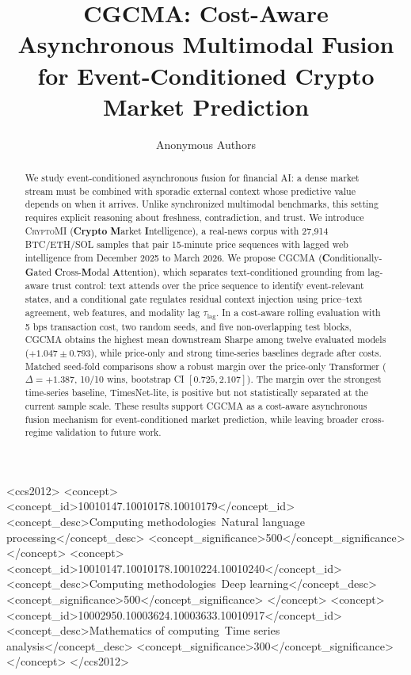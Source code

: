 \documentclass[sigconf,review,anonymous,screen]{acmart}
\newcommand{\CGCMA}{\textsc{CGCMA}}          %
\newcommand{\dataset}{\textsc{CryptoMI}}
\begin{document}
\title{CGCMA: Cost-Aware Asynchronous Multimodal Fusion for Event-Conditioned Crypto Market Prediction}

\author{Anonymous Authors}

\begin{abstract}
We study event-conditioned asynchronous fusion for financial AI: a dense market stream must be combined with sporadic external context whose predictive value depends on when it arrives. Unlike synchronized multimodal benchmarks, this setting requires explicit reasoning about freshness, contradiction, and trust. We introduce \dataset{} (\textbf{Crypto} \textbf{M}arket \textbf{I}ntelligence), a real-news corpus with 27{,}914 BTC/ETH/SOL samples that pair 15-minute price sequences with lagged web intelligence from December 2025 to March 2026. We propose \CGCMA{} (\textbf{C}onditionally-\textbf{G}ated \textbf{C}ross-\textbf{M}odal \textbf{A}ttention), which separates text-conditioned grounding from lag-aware trust control: text attends over the price sequence to identify event-relevant states, and a conditional gate regulates residual context injection using price--text agreement, web features, and modality lag $\tau_{\mathrm{lag}}$. In a cost-aware rolling evaluation with 5 bps transaction cost, two random seeds, and five non-overlapping test blocks, \CGCMA{} obtains the highest mean downstream Sharpe among twelve evaluated models ($\mathbf{+1.047\pm0.793}$), while price-only and strong time-series baselines degrade after costs. Matched seed-fold comparisons show a robust margin over the price-only Transformer ($\Delta{=}{+}1.387$, 10/10 wins, bootstrap CI $[0.725,2.107]$). The margin over the strongest time-series baseline, TimesNet-lite, is positive but not statistically separated at the current sample scale. These results support \CGCMA{} as a cost-aware asynchronous fusion mechanism for event-conditioned market prediction, while leaving broader cross-regime validation to future work.
\end{abstract}


\begin{CCSXML}
<ccs2012>
   <concept>
       <concept_id>10010147.10010178.10010179</concept_id>
       <concept_desc>Computing methodologies~Natural language processing</concept_desc>
       <concept_significance>500</concept_significance>
   </concept>
   <concept>
       <concept_id>10010147.10010178.10010224.10010240</concept_id>
       <concept_desc>Computing methodologies~Deep learning</concept_desc>
       <concept_significance>500</concept_significance>
   </concept>
   <concept>
       <concept_id>10002950.10003624.10003633.10010917</concept_id>
       <concept_desc>Mathematics of computing~Time series analysis</concept_desc>
       <concept_significance>300</concept_significance>
   </concept>
</ccs2012>
\end{CCSXML}
\end{document}
